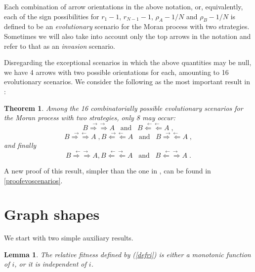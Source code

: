 \documentclass[12pt]{article}
\newtheorem{theorem}{Theorem}
\newtheorem{lemma}{Lemma}
\begin{document}
Each combination of arrow orientations in the above notation, or, equivalently, each of the sign possibilities for $r_1-1$, $r_{N-1}-1$, $\rho_A-1/N$ and $\rho_B-1/N$ is defined to be an \textit{evolutionary} scenario for the Moran process with two strategies. Sometimes we will also take into account only the top arrows in the notation and refer to that as an \textit{invasion} scenario. 

Disregarding the exceptional scenarios in which the above quantities may be null, we have 4 arrows with two possible orientations for each, amounting to 16 evolutionary scenarios. We consider the following as the most important result in \cite{taylor}:
\begin{theorem}\label{theoevoscenarios}
	Among the 16 combinatorially possible evolutionary scenarios for the Moran process with two strategies, only 8 may occur:
	\begin{equation}  \label{dominancescenarios}
B\stackrel{\rightarrow \rightarrow}{\Rightarrow \Rightarrow} A \;\;\;\mathrm{and}\;\;\; B\stackrel{\leftarrow \leftarrow}{\Leftarrow \Leftarrow} A\;,
	\end{equation}
	\begin{equation}  \label{mutualscenarios}
B\stackrel{\rightarrow \leftarrow}{\Rightarrow \Rightarrow} A \;, B\stackrel{\rightarrow \leftarrow}{\Leftarrow \Leftarrow} A \;\;\;\mathrm{and}\;\;\; B\stackrel{\rightarrow \leftarrow}{\Rightarrow \Leftarrow} A\;,
	\end{equation}
	and finally 
\begin{equation}   \label{bistabscenarios}
B\stackrel{\leftarrow \rightarrow}{\Rightarrow \Rightarrow} A, B\stackrel{\leftarrow \rightarrow}{\Leftarrow \Leftarrow} A \;\;\;\mathrm{and}\;\;\; B\stackrel{\leftarrow \rightarrow}{\Leftarrow \Rightarrow} A \;.
\end{equation}
\end{theorem}

A new proof of this result, simpler than the one in \cite{taylor},  can be found in \ref{proofevoscenarios}.


\section{Graph shapes}
\label{secgraphshapes}
We start with two simple auxiliary results.
\begin{lemma}  \label{monotoniclemma}
The relative fitness defined by (\ref{defri}) is either a monotonic function of $i$, or it is independent of $i$.
\end{lemma}
\end{document}
